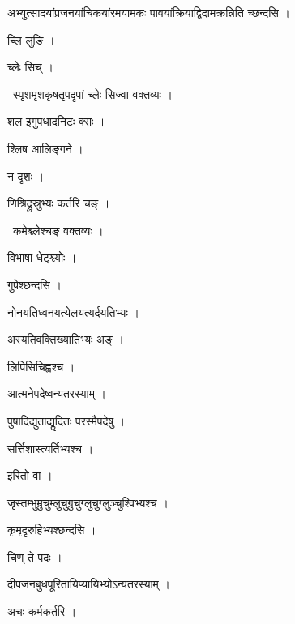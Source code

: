 \documentclass[10pt, openany, oneside]{book}
\begin{document}
\noindent अभ्युत्सादयांप्रजनयांचिकयांरमयामकः पावयांक्रियाद्विदामक्रन्निति च्छन्दसि ।

\noindent च्लि लुङि ।

\noindent च्लेः सिच् ।

\par\noindent\hspace{1.5em}{\vps वा॰}~{\qt स्पृशमृशकृषतृपदृपां च्लेः सिज्वा वक्तव्यः ।}

\noindent शल इगुपधादनिटः क्सः ।

\noindent श्लिष आलिङ्गने ।

\noindent न दृशः ।

\noindent णिश्रिद्रुस्रुभ्यः कर्तरि चङ् ।

\par\noindent\hspace{1.5em}{\vps वा॰}~{\qt कमेश्च्लेश्चङ् वक्तव्यः ।}

\noindent विभाषा धेट्श्व्योः ।

\noindent गुपेश्छन्दसि ।

\noindent नोनयतिध्वनयत्येलयत्यर्दयतिभ्यः ।

\noindent अस्यतिवक्तिख्यातिभ्यः अङ् ।

\noindent लिपिसिचिह्वश्च ।

\noindent आत्मनेपदेष्वन्यतरस्याम् ।

\noindent पुषादिद्युताद्यॢदितः परस्मैपदेषु ।

\noindent सर्त्तिशास्त्यर्तिभ्यश्च ।

\noindent इरितो वा ।

\noindent जृस्तम्भुम्रुचुम्लुचुग्रुचुग्लुचुग्लुञ्चुश्विभ्यश्च ।

\noindent कृमृदृरुहिभ्यश्छन्दसि ।

\noindent चिण् ते पदः ।

\noindent दीपजनबुधपूरितायिप्यायिभ्योऽन्यतरस्याम् ।

\noindent अचः कर्मकर्तरि ।
\end{document}
